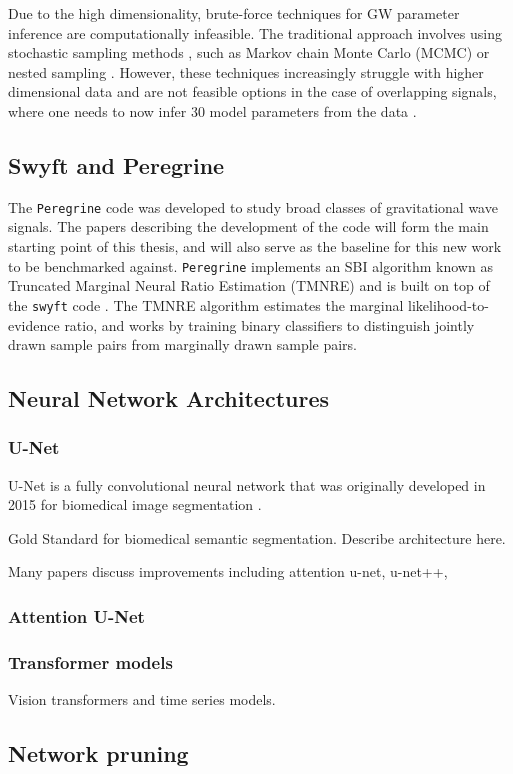 Due to the high dimensionality, brute-force techniques for GW parameter inference are computationally infeasible. The traditional approach involves using stochastic sampling methods \cite{Thrane_Talbot_2019}, such as Markov chain Monte Carlo (MCMC) \cite{Metropolis_1953,Hastings_1970} or nested sampling \cite{Skilling_2004}. However, these techniques increasingly struggle with higher dimensional data and are not feasible options in the case of overlapping signals, where one needs to now infer 30 model parameters from the data \cite{alvey2023things}.


\subsection{Swyft and Peregrine}

The \texttt{Peregrine} code was developed to study broad classes of gravitational wave signals. The papers describing the development of the code \cite{bhardwaj2023peregrine,alvey2023things} will form the main starting point of this thesis, and will also serve as the baseline for this new work to be benchmarked against. \texttt{Peregrine} implements an SBI algorithm known as Truncated Marginal Neural Ratio Estimation (TMNRE) \cite{Miller_TMNRE_2021} and is built on top of the \texttt{swyft} code \cite{Miller2022}. The TMNRE algorithm estimates the marginal likelihood-to-evidence ratio, and works by training binary classifiers to distinguish jointly drawn sample pairs from marginally drawn sample pairs.


\subsection{Neural Network Architectures}

\subsubsection{U-Net}

U-Net is a fully convolutional neural network that was originally developed in 2015 for biomedical image segmentation \cite{Ronneberger_Fischer_Brox_2015}. 

Gold Standard for biomedical semantic segmentation. Describe architecture here.

Many papers discuss improvements including attention u-net, u-net++, 

\subsubsection{Attention U-Net}

\subsubsection{Transformer models}

Vision transformers and time series models.


\subsection{Network pruning}
